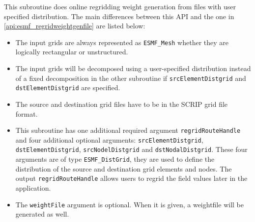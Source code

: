    This subroutine does online regridding weight generation from files with user specified distribution.
   The main differences between this API and the one in \ref{api:esmf_regridweightgenfile} are listed below:
   \begin{itemize}
   \item The input grids are always represented as {\tt ESMF\_Mesh} whether they are logically rectangular or unstructured.
   \item The input grids will be decomposed using a user-specified distribution instead of a fixed decomposition in the
   other subroutine if {\tt srcElementDistgrid} and {\tt dstElementDistgrid} are specified.
   \item The source and destination grid files have to be in the SCRIP grid file format.
   \item This subroutine has one additional required argument {\tt regridRouteHandle} and four additional optional
   arguments: {\tt srcElementDistgrid}, {\tt dstElementDistgrid}, {\tt srcNodelDistgrid} and {\tt dstNodalDistgrid}.
   These four arguments are of type {\tt ESMF\_DistGrid}, they are used to define the distribution of the source
   and destination grid elements and nodes. The output {\tt regridRouteHandle} allows users to regrid the field
   values later in the application.
   \item The {\tt weightFile} argument is optional. When it is given, a weightfile will be generated as well.
   \end{itemize}
   \smallskip
  
